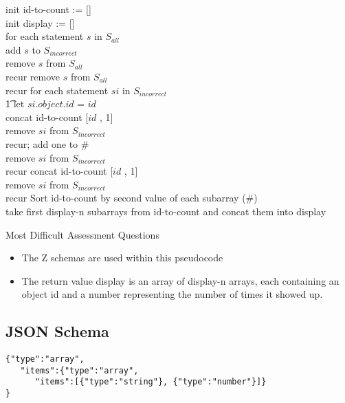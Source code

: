 \documentclass{article}
\begin{document}
\begin{algorithm}[H]

  \SetAlgoLined

  init id-to-count := [] \\
  init display := [] \\
   {
    for each statement $s$ in $S_{all}$ \\
    {
      add $s$ to $S_{incorrect}$ \\
      remove $s$ from $S_{all}$ \\
      recur
    }
    {
      remove $s$ from $S_{all}$ \\
      recur
    }}
   {
    for {each statement $si$ in $S_{incorrect}$} \\
    \t1 let $si.object.id$ = $id$ \\
    { concat id-to-count [$id$ , 1] \\
      remove $si$ from $S_{incorrect}$\\
      recur;}
    {
      { add one to \# \\
        remove $si$ from $S_{incorrect}$ \\
        recur}
    { concat id-to-count [$id$ , 1] \\
      remove $si$ from $S_{incorrect}$\\
      recur}
    }
  }
  Sort id-to-count by second value of each subarray (\#) \\
  take first display-n subarrays from id-to-count and concat them into display
  \caption{Most Difficult Assessment Questions}
\end{algorithm}
\begin{itemize}
\item The Z schemas are used within this pseudocode
\item The return value display is an array of display-n arrays, each containing an
   object id and a number representing the number of times it showed up.
\end{itemize}

\subsection{JSON Schema}

\begin{lstlisting}[style=json]
{"type":"array",
   "items":{"type":"array",
      "items":[{"type":"string"}, {"type":"number"}]}
}
\end{lstlisting}
\end{document}
